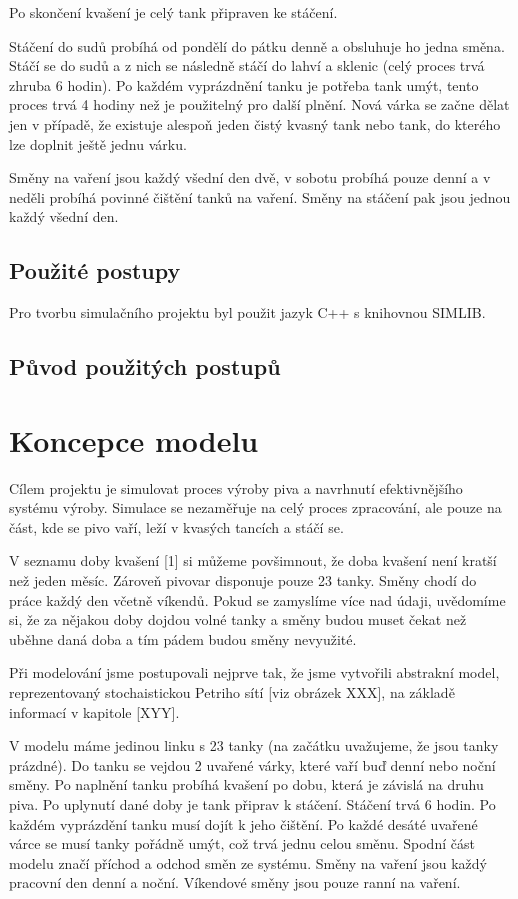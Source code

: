 \documentclass[11pt,a4paper]{article}
\begin{document}
Po skončení kvašení je celý tank připraven ke stáčení. 

Stáčení do sudů probíhá od pondělí do pátku denně a obsluhuje ho jedna směna. Stáčí se do sudů a z nich se následně stáčí do lahví a sklenic (celý proces trvá zhruba 6 hodin). Po každém vyprázdnění tanku je potřeba tank umýt, tento proces trvá 4 hodiny než je použitelný pro další plnění. Nová várka se začne dělat jen v případě, že existuje alespoň jeden čistý kvasný tank nebo tank, do kterého lze doplnit ještě jednu várku.

Směny na vaření jsou každý všední den dvě, v sobotu probíhá pouze denní a v neděli probíhá povinné čištění tanků na vaření. Směny na stáčení pak jsou jednou každý všední den.



\subsection{Použité postupy}
Pro tvorbu simulačního projektu byl použit jazyk C++ s knihovnou SIMLIB. 

\subsection{Původ použitých postupů}


\section{Koncepce modelu}
Cílem projektu je simulovat proces výroby piva a navrhnutí efektivnějšího systému výroby. Simulace se nezaměřuje na celý proces zpracování, ale pouze na část, kde se pivo vaří, leží v kvasých tancích a stáčí se.

V seznamu doby kvašení [1] si můžeme povšimnout, že doba kvašení není kratší než jeden měsíc. Zároveň pivovar disponuje pouze 23 tanky. Směny chodí do práce každý den včetně víkendů. Pokud se zamyslíme více nad údaji, uvědomíme si, že za nějakou doby dojdou volné tanky a směny budou muset čekat než uběhne daná doba a tím pádem budou směny nevyužité. 

Při modelování jsme postupovali nejprve tak, že jsme vytvořili abstrakní model, reprezentovaný stochaistickou Petriho sítí [viz obrázek XXX], na základě informací v kapitole [XYY].

V modelu máme jedinou linku s 23 tanky (na začátku uvažujeme, že jsou tanky prázdné). Do tanku se vejdou 2 uvařené várky, které vaří buď denní nebo noční směny. Po naplnění tanku probíhá kvašení po dobu, která je závislá na druhu piva. Po uplynutí dané doby je tank připrav k stáčení. Stáčení trvá 6 hodin. Po každém vyprázdění tanku musí dojít k jeho čištění. Po každé desáté uvařené várce se musí tanky pořádně umýt, což trvá jednu celou směnu. Spodní část modelu značí příchod a odchod směn ze systému. Směny na vaření jsou každý pracovní den denní a noční. Víkendové směny jsou pouze ranní na vaření.
\end{document}
